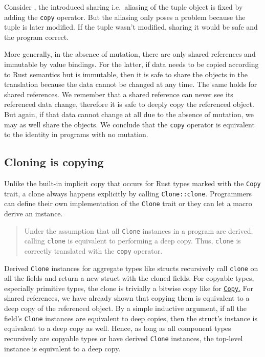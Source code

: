 Consider , the introduced sharing
i.e.~aliasing of the tuple object is fixed by adding the
\passthrough{\lstinline!copy!} operator. But the aliasing only poses a
problem because the tuple is later modified. If the tuple wasn't
modified, sharing it would be safe and the program correct.

More generally, in the absence of mutation, there are only shared
references and immutable by value bindings. For the latter, if data
needs to be copied according to Rust semantics but is immutable, then it
is safe to share the objects in the translation because the data cannot
be changed at any time. The same holds for shared references. We
remember that a shared reference can never see its referenced data
change, therefore it is safe to deeply copy the referenced object. But
again, if that data cannot change at all due to the absence of mutation,
we may as well share the objects. We conclude that the
\passthrough{\lstinline!copy!} operator is equivalent to the identity in
programs with no mutation.

\subsection{Cloning is copying}

Unlike the built-in implicit copy that occurs for Rust types marked with
the \passthrough{\lstinline!Copy!} trait, a clone always happens
explicitly by calling \passthrough{\lstinline!Clone::clone!}.
Programmers can define their own implementation of the
\passthrough{\lstinline!Clone!} trait or they can let a macro derive an
instance.

\begin{quote}
Under the assumption that all \passthrough{\lstinline!Clone!} instances
in a program are derived, calling \passthrough{\lstinline!clone!} is
equivalent to performing a deep copy. Thus,
\passthrough{\lstinline!clone!} is correctly translated with the
\passthrough{\lstinline!copy!} operator.
\end{quote}

Derived \passthrough{\lstinline!Clone!} instances for aggregate types
like structs recursively call \passthrough{\lstinline!clone!} on all the
fields and return a new struct with the cloned fields. For copyable
types, especially primitive types, the clone is trivially a bitwise copy
like for \href{https://doc.rust-lang.org/std/clone/trait.Clone.html}{\lstinline!Copy!.}
For shared references, we have already shown that copying
them is equivalent to a deep copy of the referenced object. By a simple
inductive argument, if all the field's \passthrough{\lstinline!Clone!}
instances are equivalent to deep copies, then the struct's instance is
equivalent to a deep copy as well. Hence, as long as all component types
recursively are copyable types or have derived
\passthrough{\lstinline!Clone!} instances, the top-level instance is
equivalent to a deep copy.

